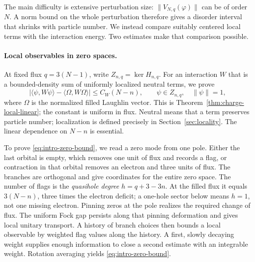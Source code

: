 The main difficulty is extensive perturbation size:
$\|V_{N,q}(\varphi)\|$ can be of order $N$. A norm bound on the
whole perturbation therefore gives a disorder interval that shrinks
with particle number. We instead compare suitably centered local
terms with the interaction energy. Two estimates make that comparison
possible.

\paragraph{Local observables in zero spaces.}
At fixed flux $q=3(N-1)$, write $Z_{n,q}=\ker H_{n,q}$.
For an interaction $W$ that is a bounded-density sum of uniformly
localized neutral terms, we prove
\begin{equation}\label{eq:intro-zero-bound}
 \left|\langle\psi,W\psi\rangle
       -\langle\Omega,W\Omega\rangle\right|
 \le C_W(N-n),\qquad
 \psi\in Z_{n,q},\quad\|\psi\|=1,
\end{equation}
where $\Omega$ is the normalized filled Laughlin vector.
This is Theorem~\ref{thm:charge-local-linear}; the constant is uniform
in flux. Neutral means that a term preserves
particle number; localization is defined precisely in
Section~\ref{sec:locality}. The linear dependence on $N-n$ is
essential.

To prove \eqref{eq:intro-zero-bound}, we read a zero mode from one
pole. Either the last orbital is empty, which removes one unit of
flux and records a flag, or contraction in that orbital removes an
electron and three units of flux. The branches are orthogonal and
give coordinates for the entire zero space. The number of flags is
the \emph{quasihole degree} $h=q+3-3n$. At the filled flux it equals
$3(N-n)$, three times the electron deficit; a one-hole sector below
means $h=1$, not one missing electron.
Pinning zeros at the
pole realizes the required change of flux. The uniform Fock gap
persists along that pinning deformation and gives local unitary
transport. A history of branch choices then bounds a local
observable by weighted flag values along the history. A first, slowly decaying
weight supplies enough information to close a second estimate with
an integrable weight. Rotation averaging yields
\eqref{eq:intro-zero-bound}.

